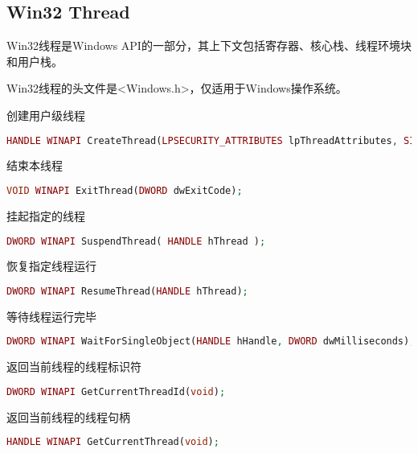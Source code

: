\subsection{Win32 Thread}

Win32线程是Windows API的一部分，其上下文包括寄存器、核心栈、线程环境块和用户栈。

Win32线程的头文件是<Windows.h>，仅适用于Windows操作系统。



\begin{compactitem}
\item 创建用户级线程

\begin{lstlisting}[language=PHP]
HANDLE WINAPI CreateThread(LPSECURITY_ATTRIBUTES lpThreadAttributes, SIZE_T dwStackSize, LPTHREAD_START_ROUTINE lpStartAddress, LPVOID lpParameter, DWORD dwCreationFlags, LPDWORD lpThreadId);
\end{lstlisting}

\item 结束本线程

\begin{lstlisting}[language=PHP]
VOID WINAPI ExitThread(DWORD dwExitCode);
\end{lstlisting}



\item 挂起指定的线程

\begin{lstlisting}[language=PHP]
DWORD WINAPI SuspendThread( HANDLE hThread );
\end{lstlisting}

\item 恢复指定线程运行

\begin{lstlisting}[language=PHP]
DWORD WINAPI ResumeThread(HANDLE hThread);
\end{lstlisting}



\item 等待线程运行完毕

\begin{lstlisting}[language=PHP]
DWORD WINAPI WaitForSingleObject(HANDLE hHandle, DWORD dwMilliseconds);
\end{lstlisting}

\item 返回当前线程的线程标识符

\begin{lstlisting}[language=PHP]
DWORD WINAPI GetCurrentThreadId(void);
\end{lstlisting}

\item 返回当前线程的线程句柄

\begin{lstlisting}[language=PHP]
HANDLE WINAPI GetCurrentThread(void);
\end{lstlisting}

\end{compactitem}


